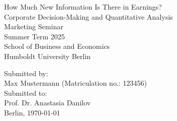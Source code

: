 \begin{titlepage}
    \begin{center}
    \vspace*{0.5cm}
    \LARGE{How Much New Information Is There in Earnings?}\\[3cm]
    \Large{Corporate Decision-Making and Quantitative Analysis}\\[1cm]
    \normalsize{
    Marketing Seminar\\
    Summer Term 2025 \\
    School of Business and Economics\\
    Humboldt University Berlin \\[3cm]
    }
    
    Submitted by:\\
    Max Mustermann (Matriculation no.: 123456)\\[3cm]
    
    Submitted to:\\
    Prof. Dr. Anastasia Danilov\\[2cm]
    
    Berlin, \today
    \end{center}
    \end{titlepage}